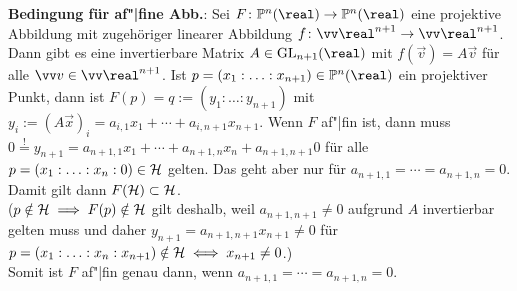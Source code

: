 \textbf{Bedingung für af"|fine Abb.}:
Sei $F\colon \PP^n(\real) \to \PP^n(\real)$ eine projektive Abbildung mit zugehöriger
linearer Abbildung $f\colon \vec{\real}^{n+1} \to \vec{\real}^{n+1}$.
Dann gibt es eine invertierbare Matrix $A \in \GL_{n+1}(\real)$ mit
$f(\vec{v}) = A\vec{v}$ für alle $\vec{v} \in \vec{\real}^{n+1}$.
Ist $p = (x_1 : \dotsc : x_{n+1}) \in \PP^n(\real)$ ein projektiver Punkt,
dann ist $F(p) = q := (y_1 : \dotsc : y_{n+1})$ mit
$y_i := (A\vec{x})_i = a_{i,1} x_1 + \dotsb + a_{i,n+1} x_{n+1}$.
Wenn $F$ af"|fin ist, dann muss
$0 \overset{!}{=} y_{n+1} = a_{n+1,1} x_1 + \dotsb + a_{n+1,n} x_n + a_{n+1,n+1} 0$ für alle
$p = (x_1 : \dotsc : x_n : 0) \in \mathcal{H}$ gelten.
Das geht aber nur für $a_{n+1,1} = \dotsb = a_{n+1,n} = 0$.
Damit gilt dann $F(\mathcal{H}) \subset \mathcal{H}$.\\
($p \notin \mathcal{H} \implies F(p) \notin \mathcal{H}$ gilt deshalb, weil
$a_{n+1,n+1} \not= 0$ aufgrund $A$ invertierbar gelten muss und daher
$y_{n+1} = a_{n+1,n+1} x_{n+1} \not= 0$ für
$p = (x_1 : \dotsc : x_n : x_{n+1}) \notin \mathcal{H} \iff x_{n+1} \not= 0$.)\\
Somit ist $F$ af"|fin genau dann, wenn $a_{n+1,1} = \dotsb = a_{n+1,n} = 0$.

\linie

